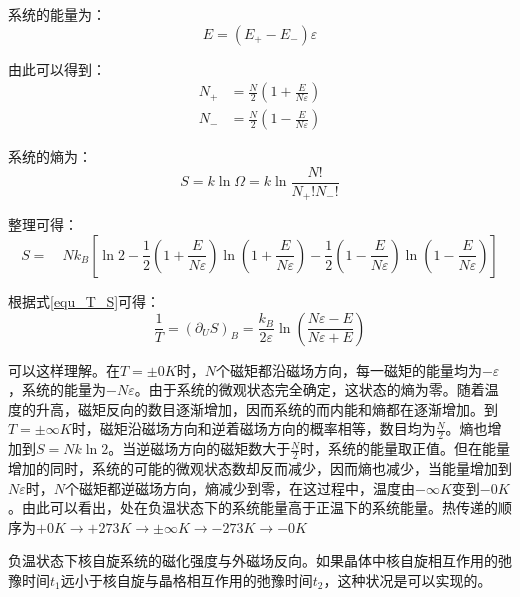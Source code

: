 \documentclass[UTF8]{ctexart}
\begin{document}
\noindent 系统的能量为：
	\begin{equation}
	E=(E_{+}-E_{-})\varepsilon
	\end{equation}

\noindent 由此可以得到：
	\begin{equation}
	\begin{aligned}
	N_{+}&=\frac{N}{2} \left(1+\frac{E}{N \varepsilon}\right)\\
	N_{-}&=\frac{N}{2} \left(1-\frac{E}{N \varepsilon}\right)
	\end{aligned}
	\end{equation}

\noindent 系统的熵为：
	\begin{equation}
	S=k \ln \Omega =k \ln \frac{N!}{N_{+}! N_{-}!}
	\end{equation}

\noindent 整理可得：
	\begin{equation}
S=\quad N k_{B}\left[\ln 2-\frac{1}{2}\left(1+\frac{E}{N \varepsilon}\right) \ln \left(1+\frac{E}{N \varepsilon}\right)-\frac{1}{2}\left(1-\frac{E}{N \varepsilon}\right) \ln \left(1-\frac{E}{N \varepsilon}\right)\right]
\end{equation}

\noindent 根据式\ref{equ_T_S}可得：
	\begin{equation}
\frac{1}{T}=\left(\partial_{U} S\right)_{B}=\frac{k_{B}}{2 \varepsilon} \ln \left(\frac{N \varepsilon-E}{N \varepsilon+E}\right)
\end{equation}

	可以这样理解。在$ T=\pm 0 K $时，$ N $个磁矩都沿磁场方向，每一磁矩的能量均为$ -\varepsilon $，系统的能量为$ -N \varepsilon $。由于系统的微观状态完全确定，这状态的熵为零。随着温度的升高，磁矩反向的数目逐渐增加，因而系统的而内能和熵都在逐渐增加。到$ T=\pm \infty K $时，磁矩沿磁场方向和逆着磁场方向的概率相等，数目均为$ \frac{N}{2} $。熵也增加到$S=Nk \ln 2$。当逆磁场方向的磁矩数大于$ \frac{N}{2} $时，系统的能量取正值。但在能量增加的同时，系统的可能的微观状态数却反而减少，因而熵也减少，当能量增加到$ N \varepsilon $时，$ N $个磁矩都逆磁场方向，熵减少到零，在这过程中，温度由$ -\infty K $变到$ -0 K $。由此可以看出，处在负温状态下的系统能量高于正温下的系统能量。热传递的顺序为$ +0 K \rightarrow +273K \rightarrow \pm \infty K \rightarrow -273K \rightarrow -0K $

	负温状态下核自旋系统的磁化强度与外磁场反向。如果晶体中核自旋相互作用的弛豫时间$ t_{1} $远小于核自旋与晶格相互作用的弛豫时间$ t_{2} $，这种状况是可以实现的。
\end{document}
